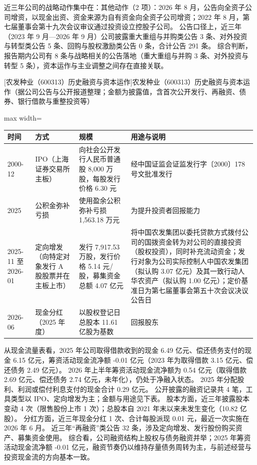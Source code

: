  近三年公司的战略动作集中在：其他动作（2 项）：2026 年 8 月，公告向全资子公司增资，以现金出资、资金来源为自有资金向全资子公司增资；2022 年 8 月，第七届董事会第十九次会议审议通过投资设立控股子公司。 公告口径上，近三年（2023 年 9 月---2026 年 9 月）公司披露重大重组与并购类公告 3 条、对外投资与转型类公告 5 条、回购与股权激励类公告 0 条，合计公告 291 条。 综合判断，报告期内公司有 8 条与战略相关的公告落地（重大重组与并购 3 条、对外投资与转型 5 条），资本运作与主业调整之间存在直接关联。

\begin{center}\small\setlength{\tabcolsep}{4pt}
[农发种业（600313）历史融资与资本运作]{农发种业（600313）历史融资与资本运作（据公司公告与公开报道整理；金额为披露值，含首次公开发行、再融资、债券、银行借款与重整投资等）}
\begin{adjustbox}{max width=\textwidth}
\begin{tabular}{@{}p{1.45cm}p{2.55cm}p{4.05cm}p{4.95cm}@{}}
\toprule
时间 & 方式 & 规模 & 用途与说明 \\
\midrule
2000-12 & IPO（上海证券交易所主板） & 向社会公开发行人民币普通股 8,\allowbreak{}000 万股，\allowbreak{}每股发行价格 6.30 元 & 经中国证监会证监发行字〔2000〕178 号文批准发行 \\
2025 & 公积金弥补亏损 & 使用盈余公积弥补亏损 1,\allowbreak{}563.18 万元 & 为提升投资者回报能力 \\
2025-11 至 2026-01 & 定向增发（向特定对象发行 A 股股票并在主板上市） & 发行 7,\allowbreak{}917.53 万股，\allowbreak{}发行价格 5.14 元/\allowbreak{}股，\allowbreak{}募集资金总额 4.07 亿元 & 将中国农发集团以委托贷款方式拨付公司的国拨资金转为对公司的直接投资（股权投资），\allowbreak{}同时补充流动资金；发行对象为公司实际控制人中国农发集团（拟认购 3.07 亿元）及其一致行动人华农资产（拟认购 1.00 亿元）；定价基准日为第七届董事会第五十次会议决议公告日 \\
2026-06 & 现金分红（2025 年度） & 以股权登记日总股本 11.61 亿股为基数 & 回报股东 \\
\bottomrule
\end{tabular}
\end{adjustbox}
\end{center}

 从现金流量表看，2025 年公司取得借款收到的现金 6.49 亿元、偿还债务支付的现金 6.15 亿元，筹资活动现金流净额 -0.01 亿元（2023 年为取得借款 3.15 亿元、偿还债务 2.49 亿元）。 2026 年上半年筹资活动现金流净额为 0.54 亿元（取得借款 2.69 亿元、偿还债务 2.74 亿元，未年化），仍处于净融入状态。 2025 年分配股利、利润或偿付利息支付的现金合计 0.29 亿元。 公开披露的融资记录共 4 笔，工具类型以 IPO、定向增发为主；金额与用途见下表。 股本方面，近三年披露股本变动 4 次（限售股份上市 1 次）；总股本自 2021 年末以来未发生变化（10.82 亿股）。 分红方面，近三年现金分红 1 次、合计每股派现 0.01 元，最近一次实施在 2026 年 6 月。 近三年“再融资”类公告 32 条，涉及定向增发、发行股份购买资产、募集资金使用。 综合看，公司融资结构上股权与债务融资并举；2025 年筹资活动现金流净额 -0.01 亿元，融资节奏仍以维持存量债务周转为主，与前述经营与投资现金流的方向基本一致。

